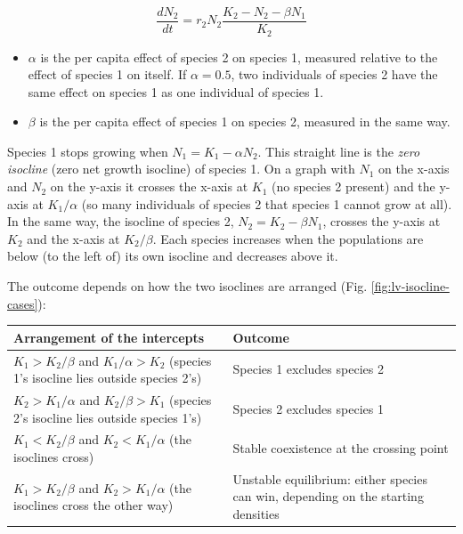 \documentclass[
  a4paper]{book}
\newcounter{none} %
\providecommand{\tightlist}{%
  \setlength{\itemsep}{0pt}\setlength{\parskip}{0pt}}
\begin{document}
\[\frac{dN_2}{dt} = r_2 N_2 \frac{K_2 - N_2 - \beta N_1}{K_2}\]

\begin{itemize}
\tightlist
\item
  \(\alpha\) is the per capita effect of species 2 on species 1, measured relative to the effect of species 1 on itself. If \(\alpha = 0.5\), two individuals of species 2 have the same effect on species 1 as one individual of species 1.
\item
  \(\beta\) is the per capita effect of species 1 on species 2, measured in the same way.
\end{itemize}

Species 1 stops growing when \(N_1 = K_1 - \alpha N_2\). This straight line is the \emph{zero isocline} (zero net growth isocline) of species 1. On a graph with \(N_1\) on the x-axis and \(N_2\) on the y-axis it crosses the x-axis at \(K_1\) (no species 2 present) and the y-axis at \(K_1/\alpha\) (so many individuals of species 2 that species 1 cannot grow at all). In the same way, the isocline of species 2, \(N_2 = K_2 - \beta N_1\), crosses the y-axis at \(K_2\) and the x-axis at \(K_2/\beta\). Each species increases when the populations are below (to the left of) its own isocline and decreases above it.

The outcome depends on how the two isoclines are arranged (Fig. \ref{fig:lv-isocline-cases}):

{\def\LTcaptype{none} %
\begin{longtable}[]{@{}
  >{\raggedright\arraybackslash}p{}
  >{\raggedright\arraybackslash}p{}@{}}
\toprule\noalign{}
\begin{minipage}[b]{\linewidth}\raggedright
Arrangement of the intercepts
\end{minipage} & \begin{minipage}[b]{\linewidth}\raggedright
Outcome
\end{minipage} \\
\midrule\noalign{}
\endhead
\bottomrule\noalign{}
\endlastfoot
\(K_1 > K_2/\beta\) and \(K_1/\alpha > K_2\) (species 1's isocline lies outside species 2's) & Species 1 excludes species 2 \\
\(K_2 > K_1/\alpha\) and \(K_2/\beta > K_1\) (species 2's isocline lies outside species 1's) & Species 2 excludes species 1 \\
\(K_1 < K_2/\beta\) and \(K_2 < K_1/\alpha\) (the isoclines cross) & Stable coexistence at the crossing point \\
\(K_1 > K_2/\beta\) and \(K_2 > K_1/\alpha\) (the isoclines cross the other way) & Unstable equilibrium: either species can win, depending on the starting densities \\
\end{longtable}
}
\end{document}
